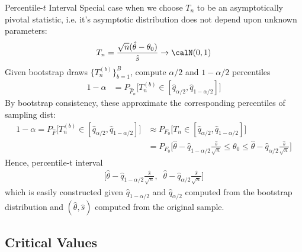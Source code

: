 \documentclass[aspectratio=169, handout]{beamer}
\newcommand{\ra}{\rightarrow}
\begin{document}
{\scriptsize
\begin{frame}{Percentile-$t$ Interval}
Special case when we choose $T_n$ to be an asymptotically pivotal
statistic, i.e. it's asymptotic distribution does not depend upon
unknown parameters:
\begin{align*}
  T_n
  =
  \frac{\sqrt{n}(\hat{\theta}-\theta_0)}{\hat{s}}
  \ra \calN(0,1)
\end{align*}
Given bootstrap draws $\{T_n^{(b)}\}_{b=1}^B$,
compute $\alpha/2$ and $1-\alpha/2$ percentiles
\begin{align*}
  1-\alpha
  &=
  P_{\hat{F}_n}
  \bigg[
    T_n^{(b)}\in [\hat{q}_{\alpha/2},\hat{q}_{1-\alpha/2}]
  \bigg]
\end{align*}
By bootstrap consistency, these approximate the corresponding
percentiles of sampling dist:
\begin{align*}
  1-\alpha
  =
  P_{\hat{F}}
  \bigg[
    T_n^{(b)}\in [\hat{q}_{\alpha/2},\hat{q}_{1-\alpha/2}]
  \bigg]
  &\approx
  P_{F_0}
  \bigg[
    T_n\in [\hat{q}_{\alpha/2},\hat{q}_{1-\alpha/2}]
  \bigg]
  \\
  &=
  P_{F_0}
  \bigg[
    \hat{\theta}
    -\hat{q}_{1-\alpha/2}
    \frac{\hat{s}}{\sqrt{n}}
    \leq
    \theta_0
    \leq
    \hat{\theta}
    -\hat{q}_{\alpha/2}
    \frac{\hat{s}}{\sqrt{n}}
  \bigg]
\end{align*}
Hence, \alert{percentile-t interval}
\begin{align*}
  \bigg[
    \hat{\theta}
    -\hat{q}_{1-\alpha/2}
    \frac{\hat{s}}{\sqrt{n}}
    ,\;\;
    \hat{\theta}
    -\hat{q}_{\alpha/2}
    \frac{\hat{s}}{\sqrt{n}}
  \bigg]
\end{align*}
which is easily constructed given $\hat{q}_{1-\alpha/2}$ and
$\hat{q}_{\alpha/2}$ computed from the bootstrap distribution and
$(\hat{\theta},\hat{s})$ computed from the original sample.
\end{frame}
}



\subsection{Critical Values}
\end{document}
